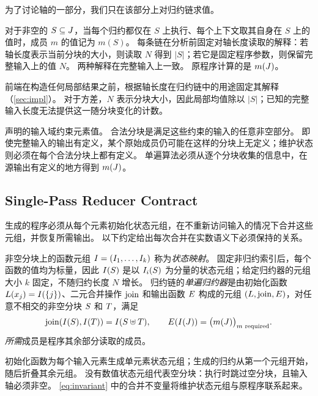 为了讨论轴的一部分，我们只在该部分上对归约链求值。

\begin{definition}
\label{def:partial}
对于非空的 $S\subseteq J$，当每个归约都仅在 $S$ 上执行、每个上下文取其自身在 $S$ 上的值时，成员 $m$ 的值记为 $m(S)$。
每条链在分析前固定对轴长度读取的解释：若轴长度表示当前分块的大小，则读取 $N$ 得到 $|S|$；若它是固定程序参数，则保留完整输入上的值 $N$。
两种解释在完整输入上一致。
原程序计算的是 $m(J)$。
\end{definition}

前端在构造任何局部结果之前，根据轴长度在归约链中的用途固定其解释（\cref{sec:impl}）。
对于方差，$N$ 表示分块大小，因此局部均值除以 $|S|$；已知的完整输入长度无法提供这一随分块变化的计数。

声明的输入域约束元素值。
合法分块是满足这些约束的输入的任意非空部分。
即使完整输入的输出有定义，某个原始成员仍可能在这样的分块上无定义；维护状态则必须在每个合法分块上都有定义。
单遍算法必须从逐个分块收集的信息中，在源输出有定义的地方得到 $m(J)$。

\subsection{Single-Pass Reducer Contract}

生成的程序必须从每个元素初始化状态元组，在不重新访问输入的情况下合并这些元组，并恢复所需输出。
以下约定给出每次合并在实数语义下必须保持的关系。

\begin{definition}
\label{def:reducer}
非空分块上的函数元组 $I=(I_1,\dots,I_k)$ 称为\emph{状态映射}。
固定非归约索引后，每个函数的值均为标量，因此 $I(S)$ 是以 $I_i(S)$ 为分量的状态元组；给定归约器的元组大小 $k$ 固定，不随归约长度 $N$ 增长。
归约链的\emph{单遍归约器}是由初始化函数 $L(x_j)=I(\{j\})$、二元合并操作 $\operatorname{join}$ 和输出函数 $E$ 构成的元组 $(L,\operatorname{join},E)$，对任意不相交的非空分块 $S$ 和 $T$，满足
\begin{equation}
\label{eq:invariant}
\operatorname{join}(I(S),I(T))=I(S\uplus T),\qquad
E(I(J))=\bigl(m(J)\bigr)_{m\text{ required}}.
\end{equation}
\emph{所需}成员是程序其余部分读取的成员。
\end{definition}

初始化函数为每个输入元素生成单元素状态元组；生成的归约从第一个元组开始，随后折叠其余元组。
没有数值状态元组代表空分块：执行时跳过空分块，且输入轴必须非空。
\cref{eq:invariant} 中的合并不变量将维护状态元组与原程序联系起来。

